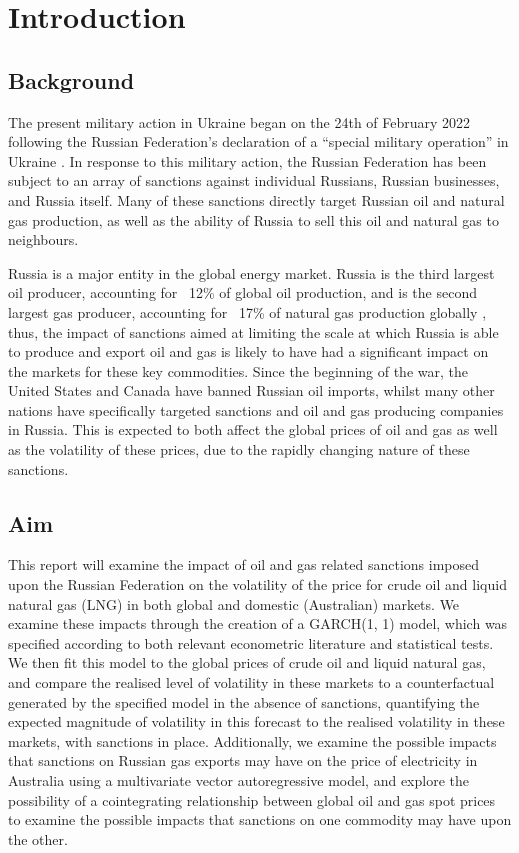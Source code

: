 \section{Introduction}
\subsection{Background}

The present military action in Ukraine began on the 24th of February 2022 following the Russian Federation’s declaration of a “special military operation” in Ukraine \cite{intro1}. In response to this military action, the Russian Federation has been subject to an array of sanctions against individual Russians, Russian businesses, and Russia itself. Many of these sanctions directly target Russian oil and natural gas production, as well as the ability of Russia to sell this oil and natural gas to neighbours.
\medskip

Russia is a major entity in the global energy market. Russia is the third largest oil producer, accounting for ~12\% of global oil production, and is the second largest gas producer, accounting for ~17\% of natural gas production globally \cite{intro2}, thus, the impact of sanctions aimed at limiting the scale at which Russia is able to produce and export oil and gas is likely to have had a significant impact on the markets for these key commodities. Since the beginning of the war, the United States and Canada have banned Russian oil imports, whilst many other nations have specifically targeted sanctions and oil and gas producing companies in Russia. This is expected to both affect the global prices of oil and gas as well as the volatility of these prices, due to the rapidly changing nature of these sanctions.

\subsection{Aim}

This report will examine the impact of oil and gas related sanctions imposed upon the Russian Federation on the volatility of the price for crude oil and liquid natural gas (LNG) in both global and domestic (Australian) markets. We examine these impacts through the creation of a GARCH(1, 1) model, which was specified according to both relevant econometric literature and statistical tests. We then fit this model to the global prices of crude oil and liquid natural gas, and compare the realised level of volatility in these markets to a counterfactual generated by the specified model in the absence of sanctions, quantifying the expected magnitude of volatility in this forecast to the realised volatility in these markets, with sanctions in place. Additionally, we examine the possible impacts that sanctions on Russian gas exports may have on the price of electricity in Australia using a multivariate vector autoregressive model, and explore the possibility of a cointegrating relationship between global oil and gas spot prices to examine the possible impacts that sanctions on one commodity may have upon the other.
\medskip

